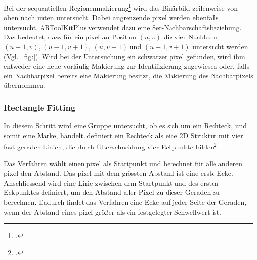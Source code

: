 Bei der sequentiellen Regionenmakierung\footcite[Vgl.][S.~200--206]{burger05} wird das Binärbild zeilenweise von oben
 nach unten untersucht. Dabei angrenzende \gls{pixel} werden ebenfalls untersucht. ARToolKitPlus verwendet dazu eine
 8er-Nachbarschaftsbeziehung. Das bedeutet, dass für ein \gls{pixel} an Position $(u,v)$ die vier Nachbarn $(u-1,v)$,
 $(u-1,v+1)$, $(u,v+1)$ und $(u+1,v+1)$ untersucht werden (Vgl.~\autoref{fig:}). Wird bei der Untersuchung ein schwarzer
 \gls{pixel} gefunden, wird ihm entweder eine neue vorläufig Makierung zur Identifizierung zugewiesen oder, falls ein
 Nachbarpixel bereits eine Makierung besitzt, die Makierung des Nachbarpixels übernommen.

\begin{comment}
	TODO: Erwähne Labeling/Bildregion erkennen aus Burger
	TODO: arGetContour gehört auch noch dazu (8er Nachbarschaft)
\end{comment}



\subsubsection{Rectangle Fitting} %
\label{sub:rectangle_fitting}

In diesem Schritt wird eine Gruppe untersucht, ob es sich um ein Rechteck, und somit eine Marke, handelt.
 \citeauthor{wagner07a} definiert ein Rechteck als eine 2D Struktur mit vier fast geraden Linien, die durch
 Überschneidung vier Eckpunkte bilden\footcite[Vgl.][S.~42]{wagner07a}.

Das Verfahren wählt einen \gls{pixel} als Startpunkt und berechnet für alle anderen \gls{pixel} den Abstand. Das
 \gls{pixel} mit dem grössten Abstand ist eine erste Ecke. Anschliessend wird eine Linie zwischen dem Startpunkt und
 des ersten Eckpunktes definiert, um den Abstand aller Pixel zu dieser Geraden zu berechnen. Dadurch findet das
 Verfahren eine Ecke auf jeder Seite der Geraden, wenn der Abstand eines \gls{pixel} größer als ein festgelegter
 Schwellwert ist.

\begin{comment}
	- Eckpunkte entlang der Region finden
	 - Abbruch: keine ecken mehr oder mehr als 4 ecken
	- Nur exakt 4 ecken sind ein rechteck

	Eckpunkte finden:
	- Wähle ersten Pixel aus und berechne die Distanz aller anderen Pixel
	- der Punkt mit der größten Distanz ist ein erster Eckpunkt
	- Untersuche alle Pixel zwischen dem ersten Pixel und ersten Eckpunkt, Pixel mit größtem Abstand ist ein weiterer Eckpunkt
	- rekursiv wiederholen, für linke seite/rechte seite
\end{comment}


